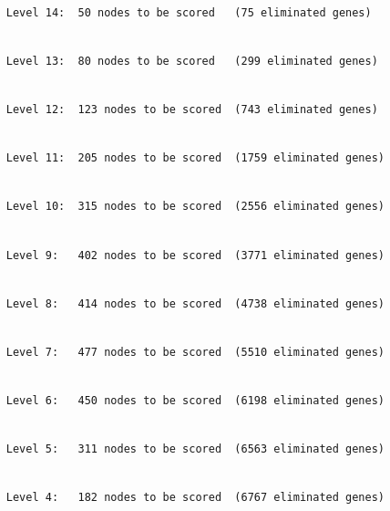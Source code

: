 \documentclass[]{article}
\begin{document}
\begin{verbatim}

     Level 14:  50 nodes to be scored   (75 eliminated genes)
\end{verbatim}

\begin{verbatim}

     Level 13:  80 nodes to be scored   (299 eliminated genes)
\end{verbatim}

\begin{verbatim}

     Level 12:  123 nodes to be scored  (743 eliminated genes)
\end{verbatim}

\begin{verbatim}

     Level 11:  205 nodes to be scored  (1759 eliminated genes)
\end{verbatim}

\begin{verbatim}

     Level 10:  315 nodes to be scored  (2556 eliminated genes)
\end{verbatim}

\begin{verbatim}

     Level 9:   402 nodes to be scored  (3771 eliminated genes)
\end{verbatim}

\begin{verbatim}

     Level 8:   414 nodes to be scored  (4738 eliminated genes)
\end{verbatim}

\begin{verbatim}

     Level 7:   477 nodes to be scored  (5510 eliminated genes)
\end{verbatim}

\begin{verbatim}

     Level 6:   450 nodes to be scored  (6198 eliminated genes)
\end{verbatim}

\begin{verbatim}

     Level 5:   311 nodes to be scored  (6563 eliminated genes)
\end{verbatim}

\begin{verbatim}

     Level 4:   182 nodes to be scored  (6767 eliminated genes)
\end{verbatim}
\end{document}
